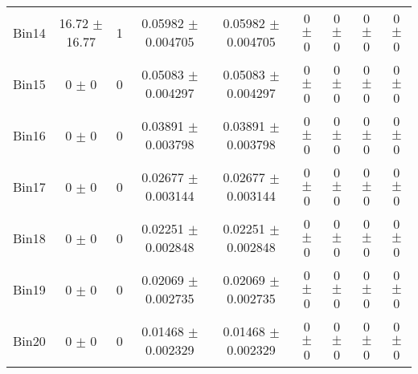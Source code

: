 \begin{tabular}{@{\extracolsep{4pt}}lcccccccc@{}}
     Bin14 & 16.72 $\pm$ 16.77 & 1 & 0.05982 $\pm$ 0.004705 & 0.05982 $\pm$ 0.004705 & 0 $\pm$ 0 & 0 $\pm$ 0 & 0 $\pm$ 0 & 0 $\pm$ 0 \\ 
     Bin15 & 0 $\pm$ 0 & 0 & 0.05083 $\pm$ 0.004297 & 0.05083 $\pm$ 0.004297 & 0 $\pm$ 0 & 0 $\pm$ 0 & 0 $\pm$ 0 & 0 $\pm$ 0 \\ 
     Bin16 & 0 $\pm$ 0 & 0 & 0.03891 $\pm$ 0.003798 & 0.03891 $\pm$ 0.003798 & 0 $\pm$ 0 & 0 $\pm$ 0 & 0 $\pm$ 0 & 0 $\pm$ 0 \\ 
     Bin17 & 0 $\pm$ 0 & 0 & 0.02677 $\pm$ 0.003144 & 0.02677 $\pm$ 0.003144 & 0 $\pm$ 0 & 0 $\pm$ 0 & 0 $\pm$ 0 & 0 $\pm$ 0 \\ 
     Bin18 & 0 $\pm$ 0 & 0 & 0.02251 $\pm$ 0.002848 & 0.02251 $\pm$ 0.002848 & 0 $\pm$ 0 & 0 $\pm$ 0 & 0 $\pm$ 0 & 0 $\pm$ 0 \\ 
     Bin19 & 0 $\pm$ 0 & 0 & 0.02069 $\pm$ 0.002735 & 0.02069 $\pm$ 0.002735 & 0 $\pm$ 0 & 0 $\pm$ 0 & 0 $\pm$ 0 & 0 $\pm$ 0 \\ 
     Bin20 & 0 $\pm$ 0 & 0 & 0.01468 $\pm$ 0.002329 & 0.01468 $\pm$ 0.002329 & 0 $\pm$ 0 & 0 $\pm$ 0 & 0 $\pm$ 0 & 0 $\pm$ 0 \\ 
\hline\hline
  \end{tabular}
